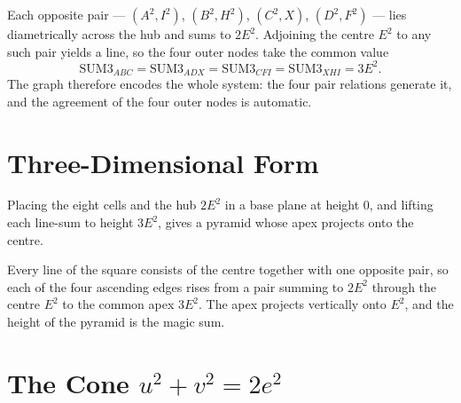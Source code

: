 \documentclass[12pt]{article}
\theoremstyle{remark}
\begin{document}
Each opposite pair --- $(A^2, I^2)$, $(B^2, H^2)$, $(C^2, X)$,
$(D^2, F^2)$ --- lies diametrically across the hub and sums to $2E^2$.
Adjoining the centre $E^2$ to any such pair yields a line, so the four
outer nodes take the common value
\[
\mathrm{SUM3}_{ABC} = \mathrm{SUM3}_{ADX} = \mathrm{SUM3}_{CFI}
= \mathrm{SUM3}_{XHI} = 3E^2 .
\]
The graph therefore encodes the whole system: the four pair relations
generate it, and the agreement of the four outer nodes is automatic.

\section{Three-Dimensional Form}

Placing the eight cells and the hub $2E^2$ in a base plane at height
$0$, and lifting each line-sum to height $3E^2$, gives a pyramid whose
apex projects onto the centre.

\begin{center}
\end{center}

Every line of the square consists of the centre together with one
opposite pair, so each of the four ascending edges rises from a pair
summing to $2E^2$ through the centre $E^2$ to the common apex $3E^2$.
The apex projects vertically onto $E^2$, and the height of the pyramid
is the magic sum.

\section{The Cone $u^2 + v^2 = 2e^2$}\label{sec:cone}
\end{document}
